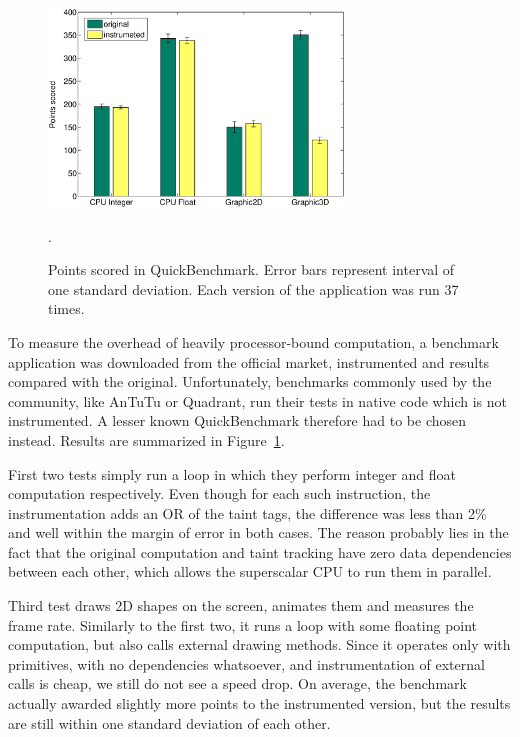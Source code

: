 \documentclass[12pt,twoside,notitlepage]{report}
\begin{document}
\begin{figure}
	\centerline{
		\includegraphics[width=0.7\textwidth]{figs/fig_eval_quickbench.eps}
	}
	\caption{Points scored in QuickBenchmark. Error bars represent interval of one standard deviation. Each version of the application was run 37 times.}.
	\label{figure:Evalutaion_QuickBench}
\end{figure}

To measure the overhead of heavily processor-bound computation, a benchmark application was downloaded from the official market, instrumented and results compared with the original. Unfortunately, benchmarks commonly used by the community, like AnTuTu or Quadrant, run their tests in native code which is not instrumented. A lesser known QuickBenchmark therefore had to be chosen instead. Results are summarized in Figure~\ref{figure:Evalutaion_QuickBench}. 

First two tests simply run a loop in which they perform integer and float computation respectively. Even though for each such instruction, the instrumentation adds an OR of the taint tags, the difference was less than 2\% and well within the margin of error in both cases. The reason probably lies in the fact that the original computation and taint tracking have zero data dependencies between each other, which allows the superscalar CPU to run them in parallel.

Third test draws 2D shapes on the screen, animates them and measures the frame rate. Similarly to the first two, it runs a loop with some floating point computation, but also calls external drawing methods. Since it operates only with primitives, with no dependencies whatsoever, and instrumentation of external calls is cheap, we still do not see a speed drop. On average, the benchmark actually awarded slightly more points to the instrumented version, but the results are still within one standard deviation of each other. 
\end{document}
